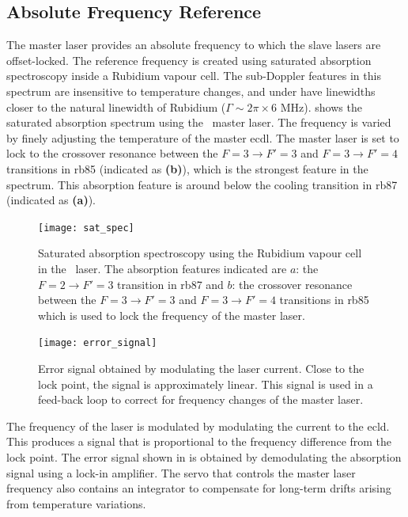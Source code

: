 \subsection{Absolute Frequency Reference}\label{subsec:muquans_master}
The master laser provides an absolute frequency to which the slave
lasers are offset-locked. The reference frequency is created using 
saturated absorption spectroscopy inside a Rubidium vapour cell. The sub-Doppler
features in this spectrum are insensitive to temperature changes, and under
have linewidths closer to the natural linewidth of
Rubidium (\(\Gamma \sim 2\pi \times 6\) MHz). 
shows the saturated absorption spectrum using the \Muquans\ master laser. The frequency is varied
by finely adjusting the temperature of the master \ac{ecdl}. The
master laser is set to lock to the crossover resonance between the \(F = 3
\rightarrow F' = 3\) and \(F = 3 \rightarrow F' = 4 \) transitions in \ac{rb85}
(indicated as \textbf{(b)}), which is the strongest feature in the spectrum. This
absorption feature is around  below the cooling
transition in \ac{rb87} (indicated as \textbf{(a)}).
\begin{figure}[!htbp]
	\texttt{[image: sat\_spec]}
	\caption[Saturated absorption spectroscopy of the \\Muquans\ master laser.]{Saturated absorption spectroscopy using the Rubidium vapour cell in the \Muquans\ laser. The absorption features indicated are \(a\): the \(F = 2 \rightarrow F' = 3\) transition in \ac{rb87} and \(b\): the crossover resonance between the \(F = 3 \rightarrow F' = 3\) and \(F = 3 \rightarrow F' = 4 \) transitions in \ac{rb85} which is used to lock the frequency of the master laser.}\label{fig:muquans_satspec}
\end{figure}
\begin{figure}[!htbp]
	\texttt{[image: error\_signal]}
	\caption[Error Signal for the \Muquans\ master servo.]{Error signal obtained by modulating the laser current. Close to the lock point, the signal is approximately linear. This signal is used in a feed-back loop to correct for frequency changes of the master laser.}\label{fig:muquans_error_signal}
\end{figure}
The frequency of the laser is modulated by modulating the current to the \ac{ecld}. This produces a signal that is
proportional to the frequency difference from the lock point. The error signal shown in
 is obtained by demodulating the absorption
signal using a lock-in amplifier. The servo that controls the master laser frequency also contains
an integrator to compensate for long-term drifts arising from temperature
variations.
